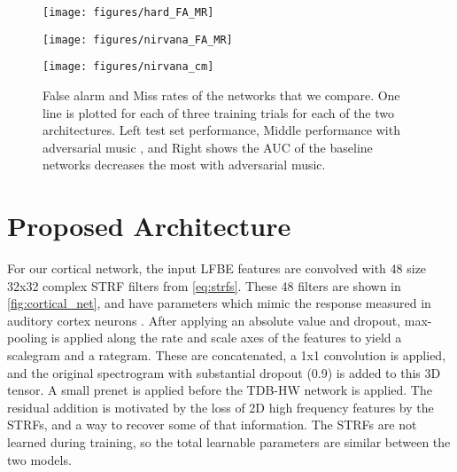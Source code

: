 \documentclass{article}
\begin{document}
\begin{figure}[t!]
	
	\begin{minipage}[b]{.32\linewidth}
		\centering
		\centerline{\texttt{[image: figures/hard\_FA\_MR]}}
	\end{minipage}
	\hfill
	\begin{minipage}[b]{0.32\linewidth}
		\centering
		\centerline{\texttt{[image: figures/nirvana\_FA\_MR]}}
	\end{minipage}
	\hfill
	\begin{minipage}[b]{0.32\linewidth}
		\centering
		\centerline{\texttt{[image: figures/nirvana\_cm]}}
	\end{minipage}

	\caption{False alarm and Miss rates of the networks that we compare. One line is plotted for each of three training trials for each of the two architectures. Left test set performance, Middle performance with adversarial music \cite{adv_music}, and Right shows the AUC of the baseline networks decreases the most with adversarial music.}
	\label{fig:perf}
\end{figure}

\section{Proposed Architecture}

For our cortical network, the input LFBE features are convolved with 48 size 32x32 complex STRF filters from \cref{eq:strfs}. These 48 filters are shown in \cref{fig:cortical_net}, and have parameters which mimic the response measured in auditory cortex neurons \cite{nsl_doc}. After applying an absolute value and dropout, max-pooling is applied along the rate and scale axes of the features to yield a scalegram and a rategram. These are concatenated, a 1x1 convolution is applied, and the original spectrogram with substantial dropout (0.9) is added to this 3D tensor. A small prenet is applied before the TDB-HW network is applied. The residual addition is motivated by the loss of 2D high frequency features by the STRFs, and a way to recover some of that information.
The STRFs are not learned during training, so the total learnable parameters are similar between the two models.
\end{document}
